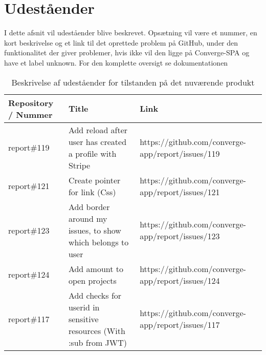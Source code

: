 \chapter{Udeståender}

I dette afsnit vil udeståender blive beskrevet. Opsætning vil være et nummer, en kort beskrivelse og et link til det oprettede problem på GitHub, under den funktionalitet der giver problemer, hvis ikke vil den ligge på Converge-SPA og have et label unknown. For den komplette oversigt se dokumentationen ~\cite{bugs}

\begin{table}[H]
\centering
\begin{tabular}[c]{p{2cm}|p{5cm}|p{5cm}}
\textbf{Repository / Nummer} & \textbf{Title}                                                            & \textbf{Link}                                             \\\hline
report\#119       & \multicolumn{1}{p{4cm}|}{Add reload after user has created a profile with Stripe}           & \multicolumn{1}{p{5cm}}{https://github.com/converge-app/report/issues/119} \\\hline
report\#121       & \multicolumn{1}{p{4cm}|}{Create pointer for link (Css)}                                     & \multicolumn{1}{p{5cm}}{https://github.com/converge-app/report/issues/121} \\\hline
report\#123       & \multicolumn{1}{p{4cm}|}{Add border around my issues, to show which belongs to user}        & \multicolumn{1}{p{5cm}}{https://github.com/converge-app/report/issues/123} \\\hline
report\#124       & \multicolumn{1}{p{4cm}|}{Add amount to open projects}                                       & \multicolumn{1}{p{5cm}}{https://github.com/converge-app/report/issues/124} \\\hline
report\#117       & \multicolumn{1}{p{4cm}|}{Add checks for userid in sensitive resources (With :sub from JWT)} & \multicolumn{1}{p{5cm}}{https://github.com/converge-app/report/issues/117}
\end{tabular}
\caption{Beskrivelse af udeståender for tilstanden på det nuværende produkt}
\label{tab:bugs}
\end{table}

